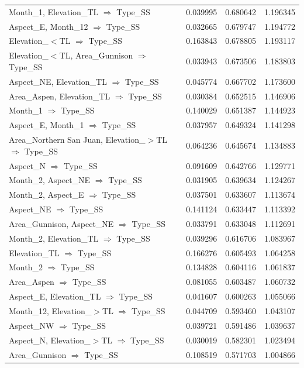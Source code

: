 \begin{tabular}{lrrr}
Month\_1, Elevation\_TL $\Rightarrow$ Type\_SS & 0.039995 & 0.680642 & 1.196345 \\
Aspect\_E, Month\_12 $\Rightarrow$ Type\_SS & 0.032665 & 0.679747 & 1.194772 \\
Elevation\_$<$TL $\Rightarrow$ Type\_SS & 0.163843 & 0.678805 & 1.193117 \\
Elevation\_$<$TL, Area\_Gunnison $\Rightarrow$ Type\_SS & 0.033943 & 0.673506 & 1.183803 \\
Aspect\_NE, Elevation\_TL $\Rightarrow$ Type\_SS & 0.045774 & 0.667702 & 1.173600 \\
Area\_Aspen, Elevation\_TL $\Rightarrow$ Type\_SS & 0.030384 & 0.652515 & 1.146906 \\
Month\_1 $\Rightarrow$ Type\_SS & 0.140029 & 0.651387 & 1.144923 \\
Aspect\_E, Month\_1 $\Rightarrow$ Type\_SS & 0.037957 & 0.649324 & 1.141298 \\
Area\_Northern San Juan, Elevation\_$>$TL $\Rightarrow$ Type\_SS & 0.064236 & 0.645674 & 1.134883 \\
Aspect\_N $\Rightarrow$ Type\_SS & 0.091609 & 0.642766 & 1.129771 \\
Month\_2, Aspect\_NE $\Rightarrow$ Type\_SS & 0.031905 & 0.639634 & 1.124267 \\
Month\_2, Aspect\_E $\Rightarrow$ Type\_SS & 0.037501 & 0.633607 & 1.113674 \\
Aspect\_NE $\Rightarrow$ Type\_SS & 0.141124 & 0.633447 & 1.113392 \\
Area\_Gunnison, Aspect\_NE $\Rightarrow$ Type\_SS & 0.033791 & 0.633048 & 1.112691 \\
Month\_2, Elevation\_TL $\Rightarrow$ Type\_SS & 0.039296 & 0.616706 & 1.083967 \\
Elevation\_TL $\Rightarrow$ Type\_SS & 0.166276 & 0.605493 & 1.064258 \\
Month\_2 $\Rightarrow$ Type\_SS & 0.134828 & 0.604116 & 1.061837 \\
Area\_Aspen $\Rightarrow$ Type\_SS & 0.081055 & 0.603487 & 1.060732 \\
Aspect\_E, Elevation\_TL $\Rightarrow$ Type\_SS & 0.041607 & 0.600263 & 1.055066 \\
Month\_12, Elevation\_$>$TL $\Rightarrow$ Type\_SS & 0.044709 & 0.593460 & 1.043107 \\
Aspect\_NW $\Rightarrow$ Type\_SS & 0.039721 & 0.591486 & 1.039637 \\
Aspect\_N, Elevation\_$>$TL $\Rightarrow$ Type\_SS & 0.030019 & 0.582301 & 1.023494 \\
Area\_Gunnison $\Rightarrow$ Type\_SS & 0.108519 & 0.571703 & 1.004866 \\
\bottomrule
\end{tabular}
